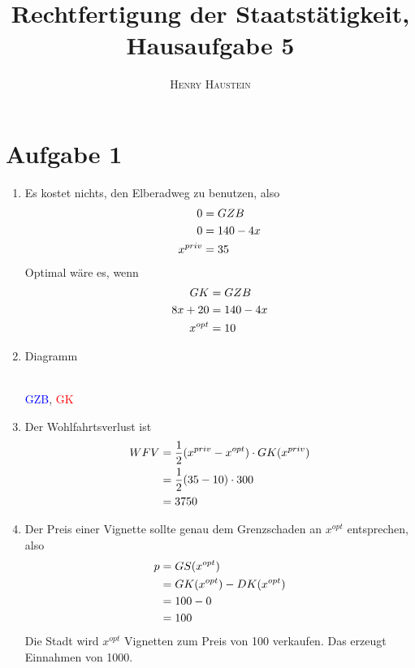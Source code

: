 \documentclass{article}
\title{\textbf{Rechtfertigung der Staatstätigkeit, Hausaufgabe 5}}
\author{\textsc{Henry Haustein}}
\date{}
\begin{document}
	\maketitle
	
	\section*{Aufgabe 1}
	\begin{enumerate}[label=(\alph*)]
		\item Es kostet nichts, den Elberadweg zu benutzen, also
		\begin{align}
			0 &= GZB \notag \\
			0 &= 140 - 4x \notag \\
			x^{priv} &= 35 \notag
		\end{align}
		Optimal wäre es, wenn
		\begin{align}
			GK &= GZB \notag \\
			8x+20 &= 140-4x \notag \\
			x^{opt} &= 10 \notag
		\end{align}
		\item Diagramm
		\begin{center}
			 \\
			\textcolor{blue}{GZB}, \textcolor{red}{GK}
		\end{center}
		\item Der Wohlfahrtsverlust ist
		\begin{align}
			WFV &= \frac{1}{2}(x^{priv} - x^{opt})\cdot GK(x^{priv}) \notag \\
			&= \frac{1}{2}(35-10)\cdot 300 \notag \\
			&= 3750 \notag
		\end{align}
		\item Der Preis einer Vignette sollte genau dem Grenzschaden an $x^{opt}$ entsprechen, also
		\begin{align}
			p &= GS(x^{opt}) \notag \\
			&= GK(x^{opt}) - DK(x^{opt}) \notag \\
			&= 100 - 0 \notag \\
			&= 100 \notag
		\end{align}
		Die Stadt wird $x^{opt}$ Vignetten zum Preis von 100 verkaufen. Das erzeugt Einnahmen von 1000.
	\end{enumerate}
	
\end{document}
